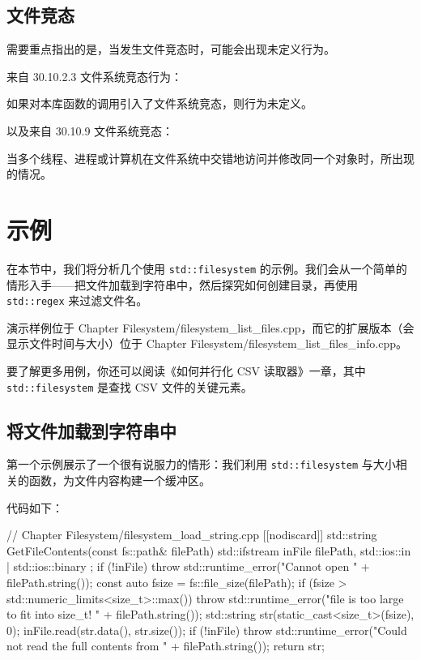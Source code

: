 \subsection{文件竞态}

需要重点指出的是，当发生文件竞态时，可能会出现未定义行为。

来自 30.10.2.3 文件系统竞态行为：

\begin{myQuote}
如果对本库函数的调用引入了文件系统竞态，则行为未定义。
\end{myQuote}

以及来自 30.10.9 文件系统竞态：

\begin{myQuote}
当多个线程、进程或计算机在文件系统中交错地访问并修改同一个对象时，所出现的情况。
\end{myQuote}

\section{示例}

在本节中，我们将分析几个使用 \texttt{std::filesystem} 的示例。我们会从一个简单的情形入手——把文件加载到字符串中，然后探究如何创建目录，再使用 \texttt{std::regex} 来过滤文件名。

演示样例位于 Chapter Filesystem/filesystem\_list\_files.cpp，而它的扩展版本（会显示文件时间与大小）位于 Chapter Filesystem/filesystem\_list\_files\_info.cpp。

要了解更多用例，你还可以阅读《如何并行化 CSV 读取器》一章，其中 \texttt{std::filesystem} 是查找 CSV 文件的关键元素。

\subsection{将文件加载到字符串中}

第一个示例展示了一个很有说服力的情形：我们利用 \texttt{std::filesystem} 与大小相关的函数，为文件内容构建一个缓冲区。

代码如下：

\begin{codebox}[cpp]
// Chapter Filesystem/filesystem_load_string.cpp
[[nodiscard]] std::string GetFileContents(const fs::path& filePath)
{
    std::ifstream inFile{ filePath, std::ios::in | std::ios::binary };
    if (!inFile)
        throw std::runtime_error("Cannot open " + filePath.string());
    const auto fsize = fs::file_size(filePath);
    if (fsize > std::numeric_limits<size_t>::max())
        throw std::runtime_error("file is too large to fit into size_t! "
                                 + filePath.string());
    std::string str(static_cast<size_t>(fsize), 0);
    inFile.read(str.data(), str.size());
    if (!inFile)
        throw std::runtime_error("Could not read the full contents from "
                                 + filePath.string());
    return str;
}
\end{codebox}

